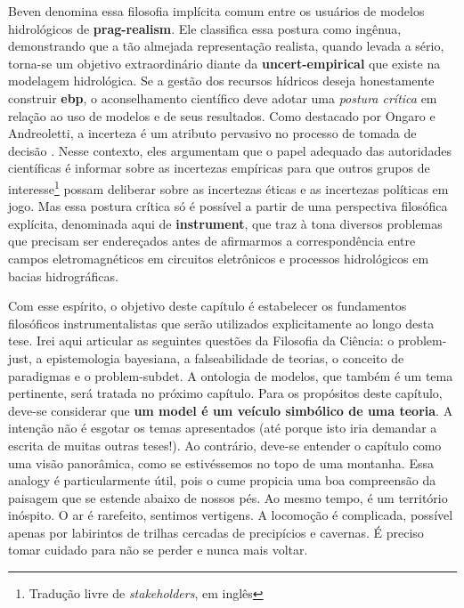 \documentclass[./main.tex]{subfiles}
\begin{document}
\par Beven denomina essa filosofia implícita comum entre os usuários de modelos hidrológicos de \textbf{\gls{prag-realism}}. Ele classifica essa postura como ingênua, demonstrando que a tão almejada representação realista, quando levada a sério, torna-se um objetivo extraordinário diante da \textbf{\gls{uncert-empirical}} que existe na modelagem hidrológica. Se a gestão dos recursos hídricos deseja honestamente construir \textbf{\gls{ebp}}, o aconselhamento científico deve adotar uma \textit{postura crítica} em relação ao uso de modelos e de seus resultados. Como destacado por Ongaro e Andreoletti, a incerteza é um atributo pervasivo no processo de tomada de decisão \cite{Ongaro2022}. Nesse contexto, eles argumentam que o papel adequado das autoridades científicas é informar sobre as incertezas empíricas para que outros grupos de interesse\footnote{Tradução livre de \textit{stakeholders}, em inglês} possam deliberar sobre as incertezas éticas e as incertezas políticas em jogo. Mas essa postura crítica só é possível a partir de uma perspectiva filosófica explícita, denominada aqui de \textbf{\gls{instrument}}, que traz à tona diversos problemas que precisam ser endereçados antes de afirmarmos a correspondência entre campos eletromagnéticos em circuitos eletrônicos e processos hidrológicos em bacias hidrográficas. 

\par Com esse espírito, o objetivo deste capítulo é estabelecer os fundamentos filosóficos instrumentalistas que serão utilizados explicitamente ao longo desta tese. Irei aqui articular as seguintes questões da Filosofia da Ciência: o \gls{problem-just}, a epistemologia bayesiana, a \gls{falseabilidade} de teorias, o conceito de paradigmas e o \gls{problem-subdet}. A ontologia de modelos, que também é um tema pertinente, será tratada no próximo capítulo. Para os propósitos deste capítulo, deve-se considerar que \textbf{um \gls{model} é um veículo simbólico de uma teoria}. A intenção não é esgotar os temas apresentados (até porque isto iria demandar a escrita de muitas outras teses!). Ao contrário, deve-se entender o capítulo como uma visão panorâmica, como se estivéssemos no topo de uma montanha. Essa \gls{analogy} é particularmente útil, pois o cume propicia uma boa compreensão da paisagem que se estende abaixo de nossos pés. Ao mesmo tempo, é um território inóspito. O ar é rarefeito, sentimos vertigens. A locomoção é complicada, possível apenas por labirintos de trilhas cercadas de precipícios e cavernas. É preciso tomar cuidado para não se perder e nunca mais voltar.
\end{document}
